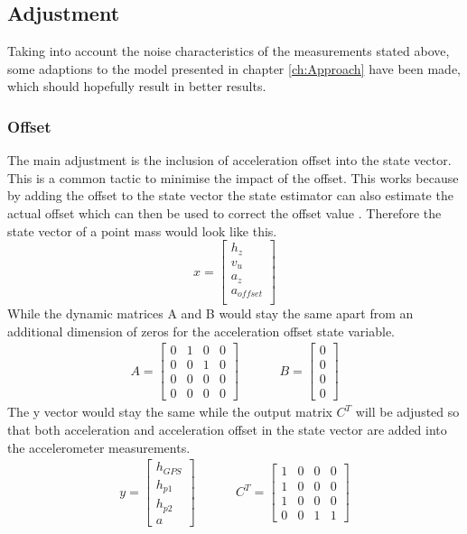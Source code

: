 \subsection{Adjustment}
Taking into account the noise characteristics of the measurements stated above, some adaptions to the model presented in chapter \ref{ch:Approach} have been made, which should hopefully result in better results.
\subsubsection{Offset}
The main adjustment is the inclusion of acceleration offset into the state vector.
This is a common tactic to minimise the impact of the offset. This works because by adding the offset to the state vector the state estimator can also estimate the actual offset which can then be used to correct the offset value \cite{DavidWSchultz2004}.
Therefore the state vector of a point mass would look like this.
$$ x = \begin{bmatrix}
        h_z \\
        v_u \\
        a_z \\
        a_{offset} \\
       \end{bmatrix}
$$
While the dynamic matrices A and B would stay the same apart from an additional dimension of zeros for the acceleration offset state variable.
\begin{align*}
 A = \begin{bmatrix}
      0 & 1 & 0 & 0 \\
      0 & 0 & 1 & 0 \\
      0 & 0 & 0 & 0 \\
      0 & 0 & 0 & 0
     \end{bmatrix}
     & \hspace{1cm}
 B = \begin{bmatrix}
      0 \\
      0 \\
      0 \\
      0
     \end{bmatrix}
\end{align*}
The y vector would stay the same while the output matrix $C^T$ will be adjusted so that both acceleration and acceleration offset in the state vector are added into the accelerometer measurements.
\begin{align*}
 y = \begin{bmatrix}
      h_{GPS} \\
      h_{p1} \\
      h_{p2} \\
      a
     \end{bmatrix}
     & \hspace{1cm}
 C^T = \begin{bmatrix}
      1 & 0 & 0 & 0 \\
      1 & 0 & 0 & 0 \\
      1 & 0 & 0 & 0 \\
      0 & 0 & 1 & 1
     \end{bmatrix}
\end{align*}

